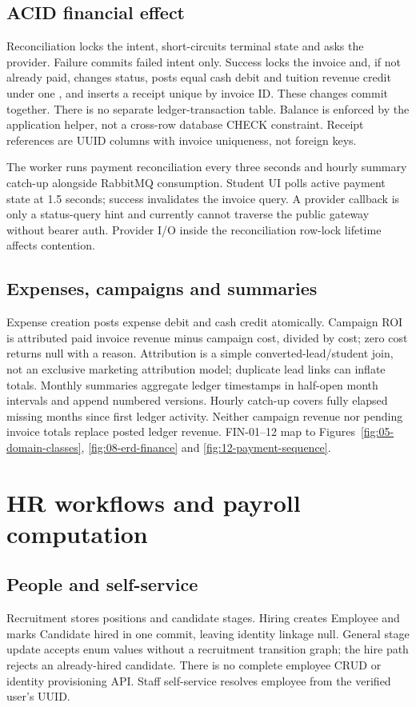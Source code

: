 \documentclass[10pt,a4paper]{article}
\begin{document}
\subsection{ACID financial effect}
Reconciliation locks the intent, short-circuits terminal state and asks the provider.
Failure commits failed intent only. Success locks the invoice and, if not already
paid, changes status, posts equal cash debit and tuition revenue credit under one
, and inserts a receipt unique by invoice ID. These changes commit
together. There is no separate ledger-transaction table. Balance is enforced by the
application helper, not a cross-row database CHECK constraint. Receipt references
are UUID columns with invoice uniqueness, not foreign keys.

The worker runs payment reconciliation every three seconds and hourly summary
catch-up alongside RabbitMQ consumption. Student UI polls active payment state at
1.5 seconds; success invalidates the invoice query. A provider callback is only a
status-query hint and currently cannot traverse the public gateway without bearer auth.
Provider I/O inside the reconciliation row-lock lifetime affects contention.

\subsection{Expenses, campaigns and summaries}
Expense creation posts expense debit and cash credit atomically. Campaign ROI is
attributed paid invoice revenue minus campaign cost, divided by cost; zero cost
returns null with a reason. Attribution is a simple converted-lead/student join,
not an exclusive marketing attribution model; duplicate lead links can inflate totals.
Monthly summaries aggregate ledger timestamps in half-open month intervals and
append numbered versions. Hourly catch-up covers fully elapsed missing months
since first ledger activity. Neither campaign revenue nor pending invoice totals
replace posted ledger revenue. FIN-01--12 map to Figures~\ref{fig:05-domain-classes},
\ref{fig:08-erd-finance} and \ref{fig:12-payment-sequence}.

\clearpage
\section{HR workflows and payroll computation}
\subsection{People and self-service}
Recruitment stores positions and candidate stages. Hiring creates Employee and
marks Candidate hired in one commit, leaving identity linkage null. General stage
update accepts enum values without a recruitment transition graph; the hire path
rejects an already-hired candidate. There is no complete employee CRUD or identity
provisioning API. Staff self-service resolves employee from the verified user's UUID.
\end{document}
